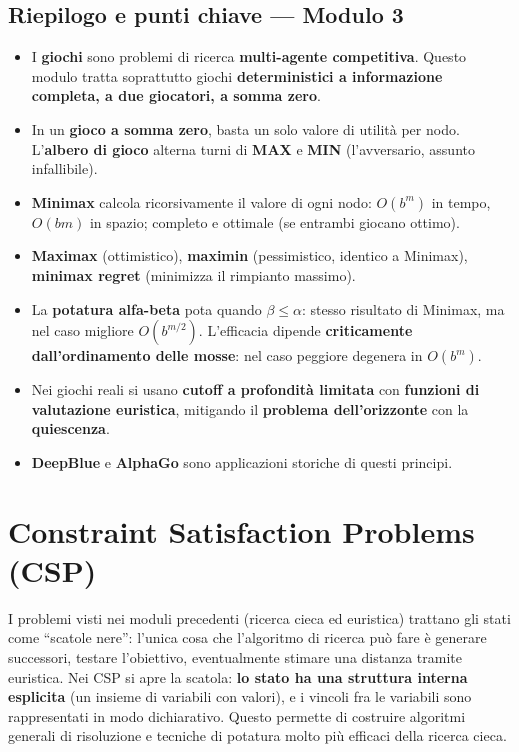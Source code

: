 \documentclass[11pt,a4paper]{report}
\begin{document}
\section*{Riepilogo e punti chiave --- Modulo 3}

\begin{itemize}
  \item I \textbf{giochi} sono problemi di ricerca \textbf{multi-agente competitiva}. Questo modulo tratta soprattutto giochi \textbf{deterministici a informazione completa, a due giocatori, a somma zero}.
  \item In un \textbf{gioco a somma zero}, basta un solo valore di utilità per nodo. L'\textbf{albero di gioco} alterna turni di \textbf{MAX} e \textbf{MIN} (l'avversario, assunto infallibile).
  \item \textbf{Minimax} calcola ricorsivamente il valore di ogni nodo: $O(b^m)$ in tempo, $O(bm)$ in spazio; completo e ottimale (se entrambi giocano ottimo).
  \item \textbf{Maximax} (ottimistico), \textbf{maximin} (pessimistico, identico a Minimax), \textbf{minimax regret} (minimizza il rimpianto massimo).
  \item La \textbf{potatura alfa-beta} pota quando $\beta \le \alpha$: stesso risultato di Minimax, ma nel caso migliore $O(b^{m/2})$. L'efficacia dipende \textbf{criticamente dall'ordinamento delle mosse}: nel caso peggiore degenera in $O(b^m)$.
  \item Nei giochi reali si usano \textbf{cutoff a profondità limitata} con \textbf{funzioni di valutazione euristica}, mitigando il \textbf{problema dell'orizzonte} con la \textbf{quiescenza}.
  \item \textbf{DeepBlue} e \textbf{AlphaGo} sono applicazioni storiche di questi principi.
\end{itemize}

\chapter{Constraint Satisfaction Problems (CSP)}

I problemi visti nei moduli precedenti (ricerca cieca ed euristica) trattano gli stati come ``scatole nere'': l'unica cosa che l'algoritmo di ricerca può fare è generare successori, testare l'obiettivo, eventualmente stimare una distanza tramite euristica. Nei CSP si apre la scatola: \textbf{lo stato ha una struttura interna esplicita} (un insieme di variabili con valori), e i vincoli fra le variabili sono rappresentati in modo dichiarativo. Questo permette di costruire algoritmi generali di risoluzione e tecniche di potatura molto più efficaci della ricerca cieca.
\end{document}
